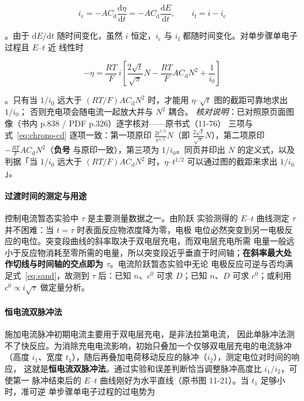 \begin{equation}
i_{\mathrm{c}}=-AC_{\mathrm{d}}\frac{\mathrm{d}\eta}{\mathrm{d}t}
=-AC_{\mathrm{d}}\frac{\mathrm{d}E}{\mathrm{d}t},
\qquad i_{\mathrm{f}}=i-i_{\mathrm{c}}
\label{eq:chrono-ic}
\end{equation}

。由于 $\mathrm{d}E/\mathrm{d}t$ 随时间变化，虽然 $i$
恒定，$i_{\mathrm{c}}$ 与 $i_{\mathrm{f}}$ 都随时间变化。对单步骤单电子过程且 $E$–$t$ 近
线性时

\begin{equation}
-\eta=\frac{RT}{F}\,i\left[\frac{2\sqrt{t}}{\sqrt{\pi}}N
-\frac{RT}{F}AC_{\mathrm{d}}N^{2}+\frac{1}{i_0}\right]
\label{eq:chrono-cd}
\end{equation}

。只有当 $1/i_0$ 远大于
$(RT/F)AC_{\mathrm{d}}N^{2}$ 时，才能用 $\eta$–$\sqrt{t}$ 图的截距可靠地求出 $1/i_0$；
否则充电项会随电流一起放大并与 $N^{2}$ 耦合。
\emph{核对说明}：已对照原页面图像（书内 p.838 / PDF p.326）逐字核对——原书式（11-76）
三项与式~\eqref{eq:chrono-cd} 逐项一致：第一项原印 $\frac{2t^{1/2}}{\pi^{1/2}}N$（即
$\frac{2\sqrt{t}}{\sqrt{\pi}}N$），第二项原印 $-\frac{RT}{F}AC_{\mathrm{d}}N^{2}$（\textbf{负号}
与原印一致），第三项为 $1/i_0$。同页并印出 $N$ 的定义式，以及判据「当 $1/i_0$ 远大于
$(RT/F)AC_{\mathrm{d}}N^{2}$ 时，$\eta$–$t^{1/2}$ 可以通过图的截距来求出 $1/i_0$」。

\paragraph{过渡时间的测定与用途} 控制电流暂态实验中 $\tau$ 是主要测量数据之一。由阶跃
实验测得的 $E$–$t$ 曲线测定 $\tau$ 并不困难：当 $t=\tau$ 时表面反应物浓度降为零，电极
电位必然突变到另一电极反应的电位。突变段曲线的斜率取决于双电层充电，而双电层充电所需
电量一般远小于反应物消耗至零所需的电量，所以突变段近乎垂直于时间轴；\textbf{在斜率最大处
作切线与时间轴的交点即为 $\tau$}。电流阶跃暂态实验中无论
电极反应可逆与否均满足式~\eqref{eq:sand}，故测到 $\tau$ 后：已知 $n$、$c^0$ 可求
$D$；已知 $n$、$D$ 可求 $c^0$；或利用 $c^0\propto i\sqrt{\tau}$ 做定量分析。

\paragraph{恒电流双脉冲法} 施加电流脉冲初期电流主要用于双电层充电，是非法拉第电流，
因此单脉冲法测不了快反应。为消除充电电流影响，初始只叠加一个仅够双电层充电的电流脉冲
（高度 $i_1$、宽度 $t_1$），随后再叠加电荷移动反应的脉冲（$i_2$），测定电位对时间的响应，
这就是\textbf{恒电流双脉冲法}。通过实验和误差判断恰当调整脉冲高度比 $i_1/i_2$，可使第一
脉冲结束后的 $E$–$t$ 曲线刚好为水平直线（原书图 11-21）。当 $t_1$ 足够小时，准可逆
单步骤单电子过程的过电势为

